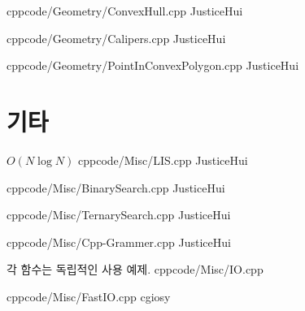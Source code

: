 \documentclass[landscape, 8pt, a4paper, twocolumn]{extarticle} %
\begin{document}
{}{}
{cpp}{code/Geometry/ConvexHull.cpp}
{JusticeHui}

{}{}
{cpp}{code/Geometry/Calipers.cpp}
{JusticeHui}

{}{}
{cpp}{code/Geometry/PointInConvexPolygon.cpp}
{JusticeHui}

\section{기타}

{}{$O(N \log N)$}
{cpp}{code/Misc/LIS.cpp}
{JusticeHui}

{}{}
{cpp}{code/Misc/BinarySearch.cpp}
{JusticeHui}

{}{}
{cpp}{code/Misc/TernarySearch.cpp}
{JusticeHui}

{}{}
{cpp}{code/Misc/Cpp-Grammer.cpp}
{JusticeHui}

{각 함수는 독립적인 사용 예제.}{}
{cpp}{code/Misc/IO.cpp}
{}

{}{}
{cpp}{code/Misc/FastIO.cpp}
{cgiosy}
\end{document}
